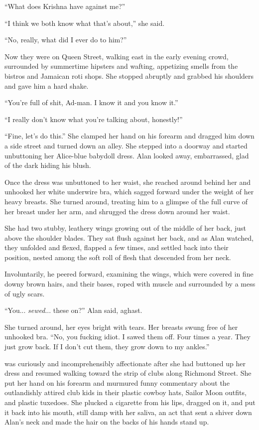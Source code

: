 ``What does Krishna have against me?''

``I think we both know what that's about,'' she said.

``No, really, what did I ever do to him?''

Now they were on Queen Street, walking east in the early evening
crowd, surrounded by summertime hipsters and wafting, appetizing
smells from the bistros and Jamaican roti shops.  She stopped abruptly
and grabbed his shoulders and gave him a hard shake.

``You're full of shit, Ad-man.  I know it and you know it.''

``I really don't know what you're talking about, honestly!''

``Fine, let's do this.'' She clamped her hand on his forearm and
dragged him down a side street and turned down an alley.  She stepped
into a doorway and started unbuttoning her Alice-blue babydoll dress. 
Alan looked away, embarrassed, glad of the dark hiding his blush.

Once the dress was unbuttoned to her waist, she reached around behind
her and unhooked her white underwire bra, which sagged forward under
the weight of her heavy breasts.  She turned around, treating him to a
glimpse of the full curve of her breast under her arm, and shrugged
the dress down around her waist.

She had two stubby, leathery wings growing out of the middle of her
back, just above the shoulder blades.  They sat flush against her
back, and as Alan watched, they unfolded and flexed, flapped a few
times, and settled back into their position, nested among the soft
roll of flesh that descended from her neck.

Involuntarily, he peered forward, examining the wings, which were
covered in fine downy brown hairs, and their bases, roped with muscle
and surrounded by a mess of ugly scars.

``You...  \textit{sewed}...  these on?'' Alan said, aghast.

She turned around, her eyes bright with tears.  Her breasts swung free
of her unhooked bra.  ``No, you fucking idiot.  I sawed them off. 
Four times a year.  They just grow back.  If I don't cut them, they
grow down to my ankles.''

 was curiously and incomprehensibly affectionate after she had
buttoned up her dress and resumed walking toward the strip of clubs
along Richmond Street.  She put her hand on his forearm and murmured
funny commentary about the outlandishly attired club kids in their
plastic cowboy hats, Sailor Moon outfits, and plastic tuxedoes.  She
plucked a cigarette from his lips, dragged on it, and put it back into
his mouth, still damp with her saliva, an act that sent a shiver down
Alan's neck and made the hair on the backs of his hands stand up.

